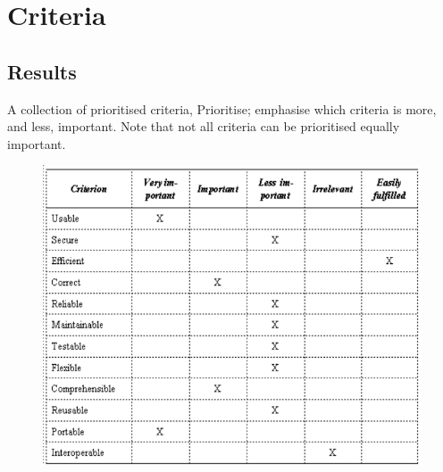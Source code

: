 \section{Criteria}
\subsection{Results}
A collection of prioritised criteria, Prioritise; emphasise which criteria is more, and less, important. Note that not all criteria can be prioritised equally important.

\begin{figure}[H]
    \centering
    \includegraphics[scale=0.75]{figures/criteriaresult.png}
\end{figure}

